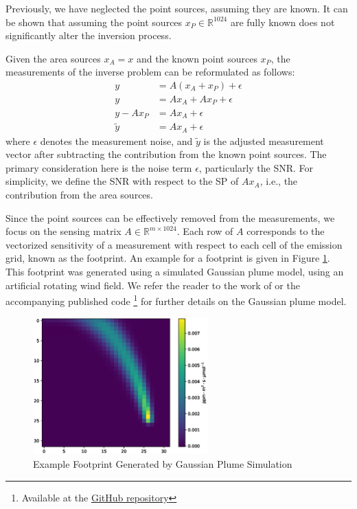 Previously, we have neglected the point sources, assuming they are known.
It can be shown that assuming the point sources $x_P \in \mathbb{R}^{1024}$ are fully known does not significantly alter the inversion process.

Given the area sources $x_A = x$ and the known point sources $x_P$, the measurements of the inverse problem can be reformulated as follows:
\begin{align}
    y &= A (x_A + x_P) + \epsilon \\
    y &= A x_A + A x_P + \epsilon \\
    y - A x_P &= A x_A + \epsilon \\
    \tilde{y} &= A x_A + \epsilon
\end{align}
where $\epsilon$ denotes the measurement noise, and $\tilde{y}$ is the adjusted measurement vector after subtracting the contribution from the known point sources.
The primary consideration here is the noise term $\epsilon$, particularly the \gls{SNR}.
For simplicity, we define the \gls{SNR} with respect to the \gls{SP} of $A x_A$, i.e., the contribution from the area sources.

Since the point sources can be effectively removed from the measurements, we focus on the sensing matrix $A \in \mathbb{R}^{m \times 1024}$.
Each row of $A$ corresponds to the vectorized sensitivity of a measurement with respect to each cell of the emission grid, known as the footprint.
An example for a footprint is given in Figure \ref{fig:footprint}.
This footprint was generated using a simulated Gaussian plume model, using an artificial rotating wind field.
We refer the reader to the work of \textcite{UrbanSparseReconstruction} or the accompanying published code \mbox{}\footnote{Available at the \href{https://github.com/tum-esm/inventory-embeddings/blob/main/src/inverse_problems/footprints/gaussian_plume_model.py}{GitHub repository}} for further details on the Gaussian plume model.
\begin{figure}[htb]
    \centering
    \includegraphics[width=0.6\textwidth]{figures/05_reconstruction/gaussian_plume_footprint.eps}
    \caption{Example Footprint Generated by Gaussian Plume Simulation}
    \label{fig:footprint}
\end{figure}

